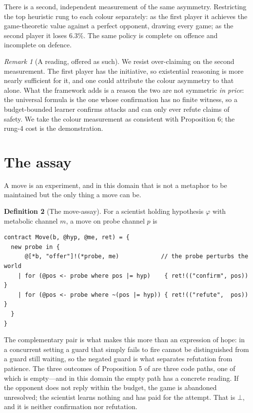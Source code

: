 \documentclass[11pt]{article}
\theoremstyle{definition}
\newtheorem{definition}{Definition}
\theoremstyle{plain}
\theoremstyle{remark}
\newtheorem{remark}[definition]{Remark}
\begin{document}
There is a second, independent measurement of the same asymmetry. Restricting
the top heuristic rung to each colour separately: as the first player it
achieves the game-theoretic value against a perfect opponent, drawing every
game; as the second player it loses $6.3\%$. The same policy is complete on
offence and incomplete on defence.

\begin{remark}[A reading, offered as such]
We resist over-claiming on the second measurement. The first player has the
initiative, so existential reasoning is more nearly sufficient for it, and one
could attribute the colour asymmetry to that alone. What the framework adds is a
reason the two are not symmetric \emph{in price}: the universal formula is the
one whose confirmation has no finite witness, so a budget-bounded learner
confirms attacks and can only ever refute claims of safety. We take the colour
measurement as consistent with Proposition 6; the rung-4 cost is the
demonstration.
\end{remark}

\section{The assay}\label{sec:assay}

A move is an experiment, and in this domain that is not a metaphor to be
maintained but the only thing a move can be.

\begin{definition}[The move-assay]
For a scientist holding hypothesis $\varphi$ with metabolic channel $m$,
a move on probe channel $p$ is
\begin{center}
\begin{minipage}{0.9\textwidth}
\begin{lstlisting}
contract Move(b, @hyp, @me, ret) = {
  new probe in {
      @[*b, "offer"]!(*probe, me)            // the probe perturbs the world
    | for (@pos <- probe where pos |= hyp)    { ret!(("confirm", pos)) }
    | for (@pos <- probe where ~(pos |= hyp)) { ret!(("refute",  pos)) }
  }
}
\end{lstlisting}
\end{minipage}
\end{center}
\end{definition}

The complementary pair is what makes this more than an expression of hope: in a
concurrent setting a guard that simply fails to fire cannot be distinguished
from a guard still waiting, so the negated guard is what separates refutation
from patience. The three outcomes of Proposition 5 of \cite{scientist} are
three code paths, one of which is empty---and in this domain the empty path has
a concrete reading. If the opponent does not reply within the budget, the game
is abandoned unresolved; the scientist learns nothing and has paid for the
attempt. That is $\bot$, and it is neither confirmation nor refutation.
\end{document}
